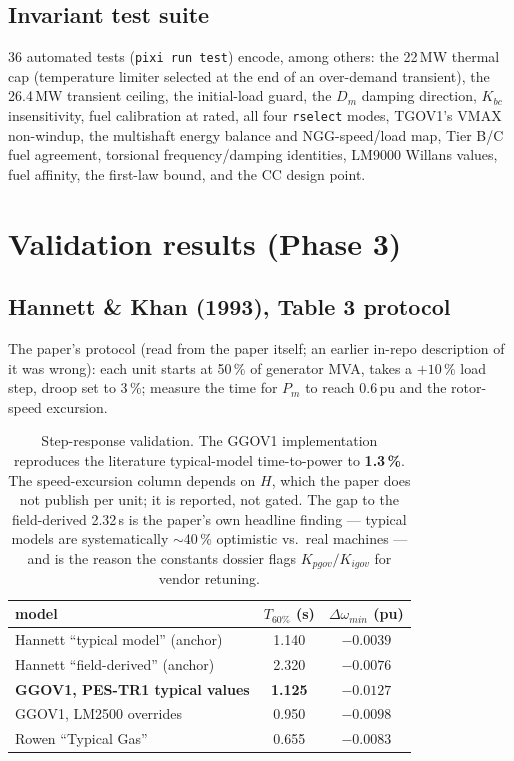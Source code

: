 \documentclass[11pt]{article}
\newcommand{\pu}{\,\text{pu}}
\begin{document}
\subsection{Invariant test suite}
36 automated tests (\texttt{pixi run test}) encode, among others: the
22\,MW thermal cap (temperature limiter selected at the end of an
over-demand transient), the 26.4\,MW transient ceiling, the initial-load
guard, the $D_m$ damping direction, $K_{bc}$ insensitivity, fuel
calibration at rated, all four \texttt{rselect} modes, TGOV1's
VMAX non-windup, the multishaft energy balance and NGG-speed/load map,
Tier B/C fuel agreement, torsional frequency/damping identities, LM9000
Willans values, fuel affinity, the first-law bound, and the CC design
point.

\section{Validation results (Phase 3)}
\label{sec:validation}

\subsection{Hannett \& Khan (1993), Table 3 protocol}
The paper's protocol (read from the paper itself; an earlier in-repo
description of it was wrong): each unit starts at 50\,\% of generator MVA,
takes a $+10\,\%$ load step, droop set to 3\,\%; measure the time for
$P_m$ to reach $0.6\pu$ and the rotor-speed excursion.

\begin{table}[h]\centering
\begin{tabular}{lcc}
\toprule
model & $T_{60\%}$ (s) & $\Delta\omega_{min}$ (pu) \\
\midrule
Hannett ``typical model'' (anchor) & 1.140 & $-0.0039$ \\
Hannett ``field-derived'' (anchor) & 2.320 & $-0.0076$ \\
\midrule
\textbf{GGOV1, PES-TR1 typical values} & \textbf{1.125} & $-0.0127$ \\
GGOV1, LM2500 overrides & 0.950 & $-0.0098$ \\
Rowen ``Typical Gas'' & 0.655 & $-0.0083$ \\
\bottomrule
\end{tabular}
\caption{Step-response validation. The GGOV1 implementation reproduces the
literature typical-model time-to-power to \textbf{1.3\,\%}. The
speed-excursion column depends on $H$, which the paper does not publish
per unit; it is reported, not gated. The gap to the field-derived 2.32\,s
is the paper's own headline finding --- typical models are systematically
$\sim$40\,\% optimistic vs.\ real machines --- and is the reason the
constants dossier flags $K_{pgov}/K_{igov}$ for vendor retuning.}
\end{table}
\end{document}
